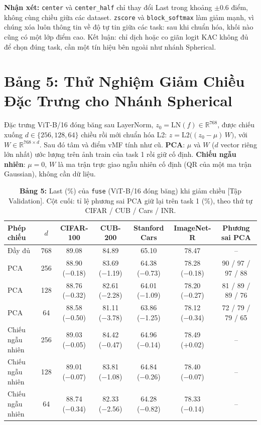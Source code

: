 \documentclass[10pt,a4paper]{article}
\begin{document}
\textbf{Nhận xét:} \texttt{center} và \texttt{center\_half} chỉ thay đổi Last trong khoảng $\pm0.6$ điểm, không cùng chiều giữa các dataset. \texttt{zscore} và \texttt{block\_softmax} làm giảm mạnh, vì chúng xóa luôn thông tin về độ tự tin giữa các task: sau khi chuẩn hóa, khối nào cũng có một lớp điểm cao. Kết luận: chỉ dịch hoặc co giãn logit KAC không đủ để chọn đúng task, cần một tín hiệu bên ngoài như nhánh Spherical.

\section{Bảng 5: Thử Nghiệm Giảm Chiều Đặc Trưng cho Nhánh Spherical}
Đặc trưng ViT-B/16 đóng băng sau LayerNorm, $z_0=\mathrm{LN}(f)\in\mathbb{R}^{768}$, được chiếu xuống $d\in\{256,128,64\}$ chiều rồi mới chuẩn hóa L2: $z = \mathrm{L2}\big((z_0-\mu)\,W\big)$, với $W\in\mathbb{R}^{768\times d}$. Sau đó tâm và điểm vMF tính như cũ. \textbf{PCA}: $\mu$ và $W$ ($d$ vector riêng lớn nhất) ước lượng trên ảnh train của task 1 rồi giữ cố định. \textbf{Chiếu ngẫu nhiên}: $\mu=0$, $W$ là ma trận trực giao ngẫu nhiên cố định (QR của một ma trận Gaussian), không cần dữ liệu.

\begin{table}[h]
\centering\small
\caption{\textbf{Bảng 5:} Last (\%) của \texttt{fuse} (ViT-B/16 đóng băng) khi giảm chiều [Tập Validation]. Cột cuối: tỉ lệ phương sai PCA giữ lại trên task 1 (\%), theo thứ tự CIFAR / CUB / Cars / INR.}
\setlength{\tabcolsep}{4pt}
\begin{tabular}{lcccccc}
\toprule
Phép chiếu & $d$ & CIFAR-100 & CUB-200 & Stanford Cars & ImageNet-R & Phương sai PCA \\
\midrule
Đầy đủ & 768 & 89.08 & 84.89 & 65.10 & 78.47 & -- \\
PCA & 256 & 88.90 (−0.18) & 83.69 (−1.19) & 64.38 (−0.73) & 78.28 (−0.18) & 90 / 97 / 97 / 88 \\
PCA & 128 & 88.76 (−0.32) & 82.61 (−2.28) & 64.01 (−1.09) & 78.20 (−0.27) & 81 / 89 / 89 / 76 \\
PCA & 64 & 88.58 (−0.50) & 81.11 (−3.78) & 63.86 (−1.25) & 78.12 (−0.34) & 72 / 79 / 79 / 65 \\
Chiếu ngẫu nhiên & 256 & 89.03 (−0.05) & 84.42 (−0.47) & 64.96 (−0.14) & 78.49 (+0.02) & -- \\
Chiếu ngẫu nhiên & 128 & 89.01 (−0.07) & 83.81 (−1.08) & 64.84 (−0.26) & 78.40 (−0.07) & -- \\
Chiếu ngẫu nhiên & 64 & 88.74 (−0.34) & 82.33 (−2.56) & 64.28 (−0.82) & 78.33 (−0.14) & -- \\
\bottomrule
\end{tabular}
\end{table}
\end{document}
